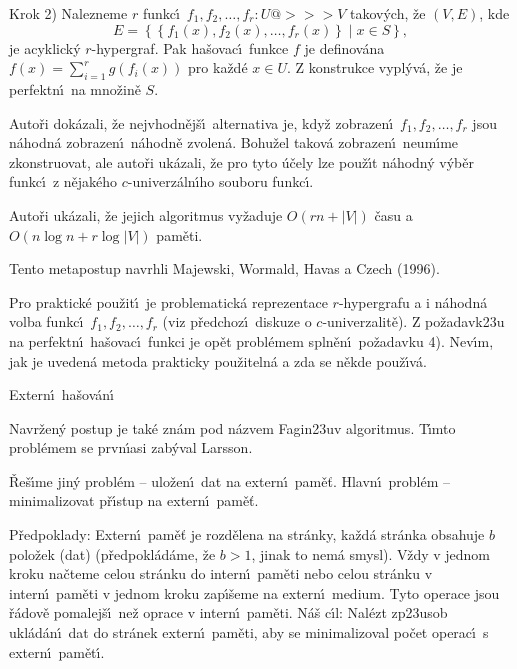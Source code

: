 \flushpar Krok 2) Nalezneme $r$ funkc\'\i\ $f_1,f_2,\dots,f_r:U@>>>
V$ takov\'ych, \v ze 
$\left(V,E\right)$, kde $$E=\left\{\left\{f_1\left(x\right),f_2\left(x\right),\dots,f_r\left(x\right)\right\}\mid x\in S\right\},$$ je acyklick\'y 
$r$-hypergraf.  Pak ha\v sovac\'\i\ funkce $f$ je definov\'ana 
$f\left(x\right)=\sum_{i=1}^rg\left(f_i\left(x\right)\right)$ pro ka\v zd\'e $x\in U$.  Z konstrukce 
vypl\'yv\'a, \v ze je perfektn\'\i\ na mno\v zin\v e $S$.  
\medskip

\flushpar Auto\v ri dok\'azali, \v ze 
nejvhodn\v ej\v s\'\i\ alternativa je, kdy\v z zobrazen\'\i\ $f_1
,f_2,\dots,f_r$ 
jsou n\'ahodn\'a zob\-razen\'\i\ n\'ahodn\v e zvolen\'a. Bohu\-\v zel takov\'a 
zobrazen\'\i\ neum\'\i me zkonstruovat, ale auto\v ri uk\'azali, \v ze 
pro tyto \'u\v cely lze pou\v z\'\i t n\'ahodn\'y v\'yb\v er funkc\'\i\ z 
n\v ejak\'eho $c$-univerz\'aln\'\i ho souboru funk\-c\'\i . 
\medskip

\flushpar Auto\v ri uk\'azali, \v ze jejich algoritmus vy\v zaduje $
O\left(rn+|V|\right)$ 
\v casu a $O\left(n\log n+r\log|V|\right)$ pam\v eti. 
\medskip

\flushpar Tento metapostup navrhli Majewski, Wormald, Havas a Czech (1996).
\medskip

\flushpar Pro praktick\'e pou\v zit\'\i\ je problematick\'a 
reprezentace $r$-hyper\-gra\-fu a i n\'ahodn\'a volba funkc\'\i\ 
$f_1,f_2,\dots,f_r$ (viz p\v redchoz\'\i\ diskuze o $c$-univerzalit\v e).  Z 
po\v zadavk\accent23u na perfektn\'\i\ ha\v sovac\'\i\ funkci je op\v et 
probl\'emem spln\v en\'\i\ po\v za\-davku 4).  Nev\'\i m, jak je uveden\'a 
metoda prakticky pou\-\v zi\-teln\'a a zda se n\v ekde pou\v z\'\i v\'a.  

\heading
Extern\'\i\ ha\v sov\'an\'\i
\endheading

\flushpar Navr\v zen\'y postup je tak\'e zn\'am pod n\'azvem Fagin\accent23uv algoritmus. T\'\i mto probl\'emem se prvn\'\i asi zab\'yval Larsson.
\medskip

\flushpar\v Re\v s\'\i me jin\'y probl\'em -- ulo\v zen\'\i\ dat na extern\'\i\ 
pam\v e\v t. Hlavn\'\i\ probl\'em -- minimalizovat p\v r\'\i stup na 
extern\'\i\ pam\v e\v t. 
\medskip

\flushpar P\v redpoklady:  Extern\'\i\ pam\v e\v t je rozd\v elena na 
str\'anky, ka\v zd\'a str\'anka obsahuje $b$ polo\v zek (dat) 
(p\v redpokl\'ad\'ame, \v ze $b>1$, jinak to nem\'a smysl).  V\v zdy v 
jednom kroku na\v cteme celou str\'anku do intern\'\i\ pam\v eti 
nebo celou str\'anku v intern\'\i\ pam\v eti v jednom kroku 
zap\'\i\v seme na extern\'\i\ medium.  Tyto operace jsou \v r\'adov\v e 
pomalej\v s\'\i\ ne\v z oprace v intern\'\i\ pam\v eti.  \newline 
N\'a\v s c\'\i l:  
Nal\'ezt zp\accent23usob ukl\'ad\'an\'\i\ dat do str\'anek extern\'\i\ 
pam\v eti, aby se minimalizoval po\v cet operac\'\i\ s extern\'\i\ 
pam\v et\'\i .  
\medskip

